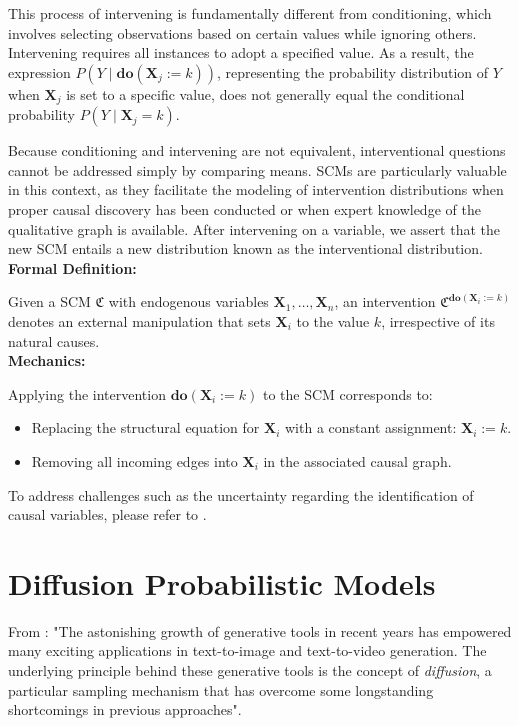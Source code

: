 \documentclass{article}
\newcommand{\X}{\mathbf{X}}
\newcommand{\C}{\mathfrak{C}}
\begin{document}
	This process of intervening is fundamentally different from conditioning, which involves selecting observations based on certain values while ignoring others. Intervening requires all instances to adopt a specified value. As a result, the expression $P(Y \mid \boldsymbol{do}(\X_j := k))$, representing the probability distribution of $Y$ when $\X_j$ is set to a specific value, does not generally equal the conditional probability $P(Y \mid \X_j = k)$.
	
	Because conditioning and intervening are not equivalent, interventional questions cannot be addressed simply by comparing means. SCMs are particularly valuable in this context, as they facilitate the modeling of intervention distributions when proper causal discovery has been conducted or when expert knowledge of the qualitative graph is available. After intervening on a variable, we assert that the new SCM entails a new distribution known as the interventional distribution. \\
	
	\textbf{Formal Definition:}
	
	Given a SCM $\C$ with endogenous variables $\X_1, \dots, \X_n$, an intervention $\C^{\boldsymbol{do}(\X_i := k)}$ denotes an external manipulation that sets $\X_i$ to the value $k$, irrespective of its natural causes. \\
	
	\textbf{Mechanics:}
	
	Applying the intervention $\boldsymbol{do}(\X_i := k)$ to the SCM corresponds to:
	\begin{itemize}
		\item Replacing the structural equation for $\X_i$ with a constant assignment: $\X_i := k$.
		\item Removing all incoming edges into $\X_i$ in the associated causal graph.
	\end{itemize}
	
	To address challenges such as the uncertainty regarding the identification of causal variables, please refer to \cite{subramanian2022}.
	
	\section{Diffusion Probabilistic Models}
	
	From \cite{chan2025}: "The astonishing growth of generative tools in recent years has empowered many exciting applications in text-to-image and text-to-video generation. The underlying principle behind these generative tools is the concept of \textit{diffusion}, a particular sampling mechanism that has overcome some longstanding shortcomings in previous approaches".
	
\end{document}

